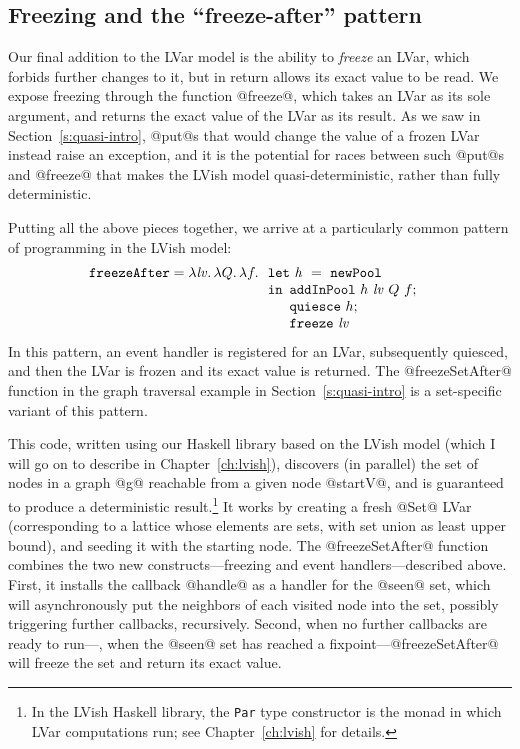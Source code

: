 \subsection{Freezing and the ``freeze-after'' pattern}\label{subsection:quasi-freeze-after}

Our final addition to the LVar model is the ability to \emph{freeze}
an LVar, which forbids further changes to it, but in return allows its
exact value to be read.  We expose freezing through the function
@freeze@, which takes an LVar as its sole argument, and returns the
exact value of the LVar as its result.  As we saw in
Section~\ref{s:quasi-intro}, @put@s that would change the value of a
frozen LVar instead raise an exception, and it is the potential for
races between such @put@s and @freeze@ that makes the LVish model
quasi-deterministic, rather than fully deterministic.

Putting all the above pieces together, we arrive at a particularly
common pattern of programming in the LVish model:
\[
\begin{array}[t]{l}
  \mbox{\texttt{freezeAfter}} = \lambda\mathit{lv}.\,\lambda Q.\,\lambda f.\,
  \begin{array}[t]{l}
    \mbox{\texttt{let}}~\mathit{h}~=~{\mbox{\texttt{newPool}}} \\
    \mbox{\texttt{in}}
      \begin{array}[t]{l}  
        {\mbox{\texttt{addInPool}}}~h~\mathit{lv}~Q~f; 
\\
        {\mbox{\texttt{quiesce}}}~h;
\\
        \mbox{\texttt{freeze}}~\mathit{lv}
      \end{array}
  \end{array}
\end{array}
\]
In this pattern, an event handler is registered for an LVar,
subsequently quiesced, and then the LVar is frozen and its exact value
is returned.  The @freezeSetAfter@ function in the graph traversal
example in Section~\ref{s:quasi-intro} is a set-specific variant of
this pattern.



This code, written using our Haskell library based on the LVish model
(which I will go on to describe in Chapter~\ref{ch:lvish}), discovers
(in parallel) the set of nodes in a graph @g@ reachable from a given
node @startV@, and is guaranteed to produce a deterministic
result.\footnote{In the LVish Haskell library, the \lstinline|Par|
  type constructor is the monad in which LVar computations run; see
  Chapter~\ref{ch:lvish} for details.}  It works by creating a fresh
@Set@ LVar (corresponding to a lattice whose elements are sets, with
set union as least upper bound), and seeding it with the starting
node.  The @freezeSetAfter@ function combines the two new
constructs---freezing and event handlers---described above.  First, it
installs the callback @handle@ as a handler for the @seen@ set, which
will asynchronously put the neighbors of each visited node into the
set, possibly triggering further callbacks, recursively.  Second, when
no further callbacks are ready to run---\ie, when the @seen@ set has
reached a fixpoint---@freezeSetAfter@ will freeze the set and return
its exact value.

